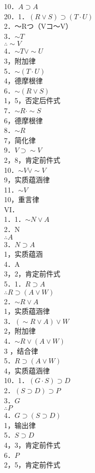 10．$A \supset A$\\
20．1．$(R \vee S) \supset(T \cdot U)$\\
2．～Rつ（Vコ～V）\\
3．$\sim T$\\
$\therefore \sim V$\\
4．$\sim T \vee \sim U$\\
3，附加律\\
5．$\sim(T \cdot U)$\\
4，德摩根律\\
6．$\sim(R \vee S)$\\
1，5，否定后件式\\
7．$\sim R \cdot \sim S$\\
6，德摩根律\\
8．$\sim R$\\
7，简化律\\
9．$V \supset \sim V$\\
2，8，肯定前件式\\
10．$\sim V \vee \sim V$\\
9，实质蕴涵律\\
11．$\sim V$\\
10，重言律\\
VI．\\
1．1．$\sim N \vee A$\\
2．N\\
$\therefore A$\\
3．$N \supset A$\\
1，实质蕴涵\\
4．A\\
3，2，肯定前件式\\
5．1．$R \supset A$\\
$\therefore R \supset(A \vee W)$\\
2．$\sim R \vee A$\\
1，实质蕴涵律\\
3．$(\sim R \vee A) \vee W$\\
2，附加律\\
4．$\sim R \vee(A \vee W)$\\
3 ，结合律\\
5．$R \supset(A \vee W)$\\
4，实质蕴涵律\\
10．1．$(G \cdot S) \supset D$\\
2．$(S \supset D) \supset P$\\
3．$G$\\
$\therefore P$\\
4．$G \supset(S \supset D)$\\
1，输出律\\
5．$S \supset D$\\
4，3，肯定前件式\\
6．$P$\\
2，5，肯定前件式

